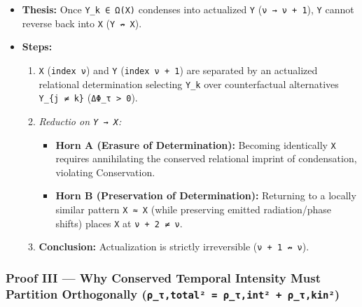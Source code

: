 \documentclass[
]{article}
\begin{document}
\begin{itemize}
\item
  \textbf{Thesis:} Once \texttt{\textquotesingle{}Y\_k~∈~Ω(X)} condenses
  into actualized \texttt{Y} (\texttt{ν~→~ν~+~1}), \texttt{Y} cannot
  reverse back into \texttt{X} (\texttt{Y~↛~X}).
\item
  \textbf{Steps:}

  \begin{enumerate}
  \def\labelenumi{\arabic{enumi}.}
  \item
    \texttt{X} (\texttt{index~ν}) and \texttt{Y} (\texttt{index~ν~+~1})
    are separated by an actualized relational determination selecting
    \texttt{\textquotesingle{}Y\_k} over counterfactual alternatives
    \texttt{\textquotesingle{}Y\_\{j~≠~k\}}
    (\texttt{ΔΦ\_τ~\textgreater{}~0}).
  \item
    \emph{Reductio on \texttt{Y~→~X}:}

    \begin{itemize}
    \item
      \textbf{Horn A (Erasure of Determination):} Becoming identically
      \texttt{X} requires annihilating the conserved relational imprint
      of condensation, violating Conservation.
    \item
      \textbf{Horn B (Preservation of Determination):} Returning to a
      locally similar pattern \texttt{X\textquotesingle{}~≈~X} (while
      preserving emitted radiation/phase shifts) places
      \texttt{X\textquotesingle{}} at \texttt{ν~+~2~≠~ν}.
    \end{itemize}
  \item
    \textbf{Conclusion:} Actualization is strictly irreversible
    (\texttt{ν~+~1~↛~ν}).
  \end{enumerate}
\end{itemize}

\subsubsection{\texorpdfstring{Proof III --- Why Conserved Temporal
Intensity Must Partition Orthogonally
(\texttt{ρ\_τ,total²~=~ρ\_τ,int²~+~ρ\_τ,kin²})}{Proof III --- Why Conserved Temporal Intensity Must Partition Orthogonally (ρ\_τ,total²~=~ρ\_τ,int²~+~ρ\_τ,kin²)}}\label{proof-iii-why-conserved-temporal-intensity-must-partition-orthogonally-ux3c1_ux3c4totaluxb2-ux3c1_ux3c4intuxb2-ux3c1_ux3c4kinuxb2}
\end{document}
